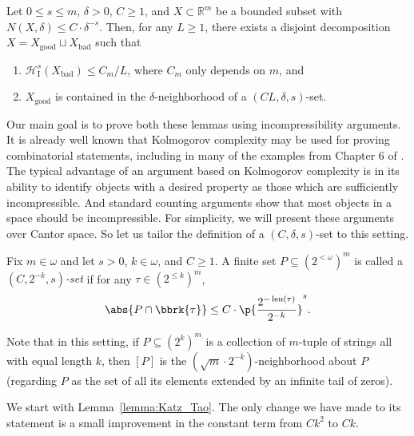 \begin{lemma}
    \label{lemma:Lemma_2.3_of_Orponen}
    Let $0 \leq s \leq m$, $\delta > 0$, $C \geq 1$, and $X \subset \mathbb{R}^m$ be a bounded subset with $N(X, \delta) \leq C \cdot \delta^{-s}$. Then, for any $L \geq 1$, there exists a disjoint decomposition $X = X_{\operatorname{good}} \sqcup X_{\operatorname{bad}}$ such that
    \begin{enumerate}[label = (\roman*)]
        \item $\mathcal{H}^s_{\operatorname{I}}(X_{\operatorname{bad}}) \leq C_m / L$, where $C_m$ only depends on $m$, and
        \item $X_{\operatorname{good}}$ is contained in the $\delta$-neighborhood of a $(CL, \delta, s)$-set.
    \end{enumerate}
\end{lemma}

Our main goal is to prove both these lemmas using incompressibility arguments. It is already well known that Kolmogorov complexity may be used for proving combinatorial statements, including in many of the examples from Chapter 6 of \cite{LV08}. The typical advantage of an argument based on Kolmogorov complexity is in its ability to identify objects with a desired property as those which are sufficiently incompressible. And standard counting arguments show that most objects in a space should be incompressible. For simplicity, we will present these arguments over Cantor space. So let us tailor the definition of a $(C, \delta, s)$-set to this setting. 

\begin{definition}
    \label{definition:C_k_s_set}
    Fix $m \in \omega$ and let $s > 0$, $k \in \omega$, and $C \geq 1$. A finite set $P \subseteq (2^{<\omega})^m$ is called a \textit{$(C, 2^{-k}, s)$-set} if for any $\tau \in (2^{\leq k})^m$,
    \begin{align*}
        \abs{P \cap \bbrk{\tau}} \leq C \cdot \p{\frac{2^{-\operatorname{len}(\tau)}}{2^{-k}}}^s.
    \end{align*}
\end{definition}

Note that in this setting, if $P \subseteq (2^k)^m$ is a collection of $m$-tuple of strings all with equal length $k$, then $[P]$ is the $(\sqrt{m} \cdot 2^{-k})$-neighborhood about $P$ (regarding $P$ as the set of all its elements extended by an infinite tail of zeros).

We start with Lemma~\ref{lemma:Katz_Tao}. The only change we have made to its statement is a small improvement in the constant term from $Ck^2$ to $Ck$.

